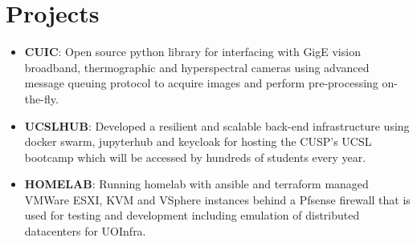 \documentclass[letterpaper,10.5pt]{article}
\newcommand{\resumeItem}[2]{
\item\small{
\textbf{#1}{: #2 \vspace{-2pt}}
}
}
\newcommand{\resumeSubItem}[2]{\resumeItem{#1}{#2}\vspace{-4pt}}
\newcommand{\resumeSubHeadingListStart}{\begin{itemize}[leftmargin=*]}
\newcommand{\resumeSubHeadingListEnd}{\end{itemize}}
\begin{document}
\section{\color[HTML]{DF691A} Projects}
\resumeSubHeadingListStart
\resumeSubItem{CUIC}
{Open source python library for interfacing with GigE vision broadband, thermographic and hyperspectral cameras using advanced message queuing protocol to acquire images and perform pre-processing on-the-fly.}
\resumeSubItem{UCSLHUB}
{Developed a resilient and scalable back-end infrastructure using docker swarm, jupyterhub and keycloak for hosting the CUSP's UCSL bootcamp which will be accessed by hundreds of students every year.}
\resumeSubItem{HOMELAB}
{Running homelab with ansible and terraform managed VMWare ESXI, KVM and VSphere instances behind a Pfsense firewall that is used for testing and development including emulation of distributed datacenters for UOInfra.}
\resumeSubHeadingListEnd
\end{document}
